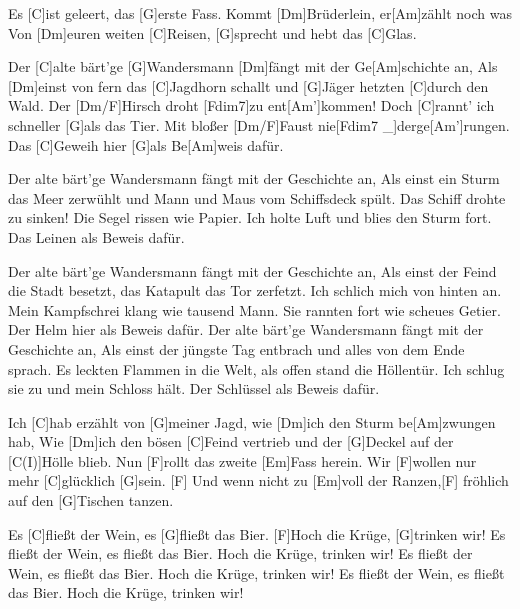 

\hfill{}



\begin{guitar}
	Es [C]ist geleert, das [G]erste Fass. Kommt [Dm]Brüderlein, er[Am]zählt noch was
	Von [Dm]euren weiten [C]Reisen, [G]sprecht und hebt das [C]Glas.
	
	Der [C]alte bärt'ge [G]Wandersmann [Dm]fängt mit der Ge[Am]schichte an,
	Als [Dm]einst von fern das [C]Jagdhorn schallt und [G]Jäger hetzten [C]durch den Wald.
	Der [Dm/F]Hirsch droht [Fdim7]zu ent[Am']kommen! Doch [C]rannt' ich schneller [G]als das Tier.
	Mit bloßer [Dm/F]Faust nie[Fdim7 _]{derge}[Am']rungen. Das [C]Geweih hier [G]als Be[Am]weis dafür.
	
	Der alte bärt'ge Wandersmann fängt mit der Geschichte an,
	Als einst ein Sturm das Meer zerwühlt und Mann und Maus vom Schiffsdeck spült.
	Das Schiff drohte zu sinken! Die Segel rissen wie Papier.
	Ich holte Luft und blies den Sturm fort. Das Leinen als Beweis dafür.
	
	 
	
	Der alte bärt'ge Wandersmann fängt mit der Geschichte an,
	Als einst der Feind die Stadt besetzt, das Katapult das Tor zerfetzt.
	Ich schlich mich von hinten an. Mein Kampfschrei klang wie tausend Mann.
	Sie rannten fort wie scheues Getier. Der Helm hier als Beweis dafür.
	\pagebreak
	Der alte bärt'ge Wandersmann fängt mit der Geschichte an,
	Als einst der jüngste Tag entbrach und alles von dem Ende sprach.
	Es leckten Flammen in die Welt, als offen stand die Höllentür.
	Ich schlug sie zu und mein Schloss hält. Der Schlüssel als Beweis dafür.
	
	 
	
	Ich [C]hab erzählt von [G]meiner Jagd, wie [Dm]ich den Sturm be[Am]zwungen hab,
	Wie [Dm]ich den bösen [C]Feind vertrieb und der [G]Deckel auf der [C(I)]Hölle blieb.
	Nun [F]rollt das zweite [Em]Fass herein. Wir [F]wollen nur mehr [C]glücklich [G]sein.
	[F] Und wenn nicht zu [Em]voll der Ranzen,[F] fröhlich auf den [G]Tischen tanzen.
	
	Es [C]fließt der Wein, es [G]fließt das Bier. [F]Hoch die Krüge, [G]trinken wir!
	Es fließt der Wein, es fließt das Bier. Hoch die Krüge, trinken wir!
	Es fließt der Wein, es fließt das Bier. Hoch die Krüge, trinken wir!
	Es fließt der Wein, es fließt das Bier. Hoch die Krüge, trinken wir!
\end{guitar}




